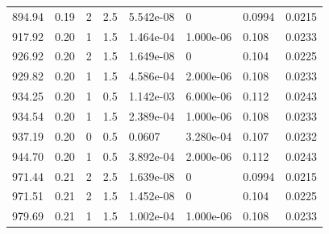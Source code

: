 \documentclass[preview]{standalone}
\begin{document}
{{{\begin{tabular}{L{1.2cm}C{1.2cm} C{0.3cm}C{0.5cm} C{1.4cm}C{1.4cm} C{1.4cm}C{1.4cm}}
  894.94  &  0.19  & 2     & 2.5 &  5.542e-08  & 0  & 0.0994 &  0.0215   \\ 
  917.92  &  0.20  & 1     & 1.5 &  1.464e-04  & 1.000e-06  & 0.108 &  0.0233   \\ 
  926.92  &  0.20  & 2     & 1.5 &  1.649e-08  & 0  & 0.104 &  0.0225   \\ 
  929.82  &  0.20  & 1     & 1.5 &  4.586e-04  & 2.000e-06  & 0.108 &  0.0233   \\ 
  934.25  &  0.20  & 1     & 0.5 &  1.142e-03  & 6.000e-06  & 0.112 &  0.0243   \\ 
  934.54  &  0.20  & 1     & 1.5 &  2.389e-04  & 1.000e-06  & 0.108 &  0.0233   \\ 
  937.19  &  0.20  & 0     & 0.5 &  0.0607  & 3.280e-04  & 0.107 &  0.0232   \\ 
  944.70  &  0.20  & 1     & 0.5 &  3.892e-04  & 2.000e-06  & 0.112 &  0.0243   \\ 
  971.44  &  0.21  & 2     & 2.5 &  1.639e-08  & 0  & 0.0994 &  0.0215   \\ 
  971.51  &  0.21  & 2     & 1.5 &  1.452e-08  & 0  & 0.104 &  0.0225   \\ 
  979.69  &  0.21  & 1     & 1.5 &  1.002e-04  & 1.000e-06  & 0.108 &  0.0233   \\ 
\hline 
\end{tabular} 

}}}
\end{document}
